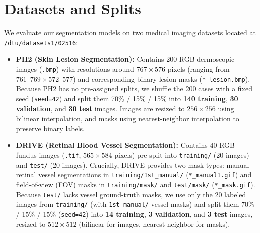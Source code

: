 \section{Datasets and Splits}
\label{sec:datasets}

We evaluate our segmentation models on two medical imaging datasets located at \texttt{/dtu/datasets1/02516}:

\begin{itemize}
    \item \textbf{PH2 (Skin Lesion Segmentation):} Contains 200 RGB dermoscopic images (\texttt{.bmp}) with resolutions around $767 \times 576$ pixels (ranging from $761\text{--}769 \times 572\text{--}577$) and corresponding binary lesion masks (\texttt{*\_lesion.bmp}). Because PH2 has no pre-assigned splits, we shuffle the 200 cases with a fixed seed (\texttt{seed=42}) and split them 70\% / 15\% / 15\% into \textbf{140 training}, \textbf{30 validation}, and \textbf{30 test} images. Images are resized to $256 \times 256$ using bilinear interpolation, and masks using nearest-neighbor interpolation to preserve binary labels.
    \item \textbf{DRIVE (Retinal Blood Vessel Segmentation):} Contains 40 RGB fundus images (\texttt{.tif}, $565 \times 584$ pixels) pre-split into \texttt{training/} (20 images) and \texttt{test/} (20 images). Crucially, DRIVE provides two mask types: manual retinal vessel segmentations in \texttt{training/1st\_manual/} (\texttt{*\_manual1.gif}) and field-of-view (FOV) masks in \texttt{training/mask/} and \texttt{test/mask/} (\texttt{*\_mask.gif}). Because \texttt{test/} lacks vessel ground-truth masks, we use only the 20 labeled images from \texttt{training/} (with \texttt{1st\_manual/} vessel masks) and split them 70\% / 15\% / 15\% (\texttt{seed=42}) into \textbf{14 training}, \textbf{3 validation}, and \textbf{3 test} images, resized to $512 \times 512$ (bilinear for images, nearest-neighbor for masks).
\end{itemize}
